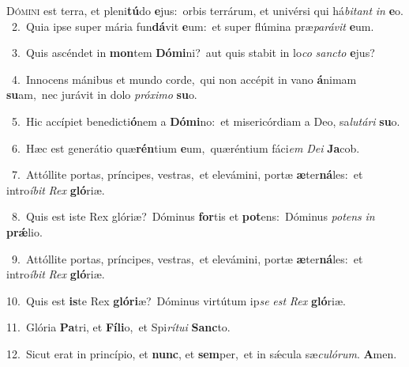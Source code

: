 \lettrine{\initial\textcolor{\initialcolor}{D}}{ómini} est terra, et pleni\-\textbf{tú}\-do \textbf{e}\-jus:~\star orbis terrárum, et univérsi qui há\-\textit{bi}\-\textit{tant} \textit{in} \textbf{e}\-o.\\
{\numbfont\textcolor{\numbcolor}{~2.}}~Quia ipse super mária fun\-\textbf{dá}\-vit \textbf{e}\-um:~\star et super flúmina præ\-\textit{pa}\-\textit{rá}\textit{vit} \textbf{e}\-um.\par
{\numbfont\textcolor{\numbcolor}{~3.}}~Quis ascéndet in \textbf{mon}\-tem \textbf{Dó}\-\textbf{mi}ni?~\star aut quis stabit in lo\textit{co} \textit{sanc}\-\textit{to} \textbf{e}\-jus?\par
{\numbfont\textcolor{\numbcolor}{~4.}}~Innocens mánibus et mundo corde,~\dagger qui non accépit in vano \textbf{á}\-nimam \textbf{su}\-am,~\star nec jurávit in dolo \textit{pró}\-\textit{xi}\textit{mo} \textbf{su}\-o.\par
{\numbfont\textcolor{\numbcolor}{~5.}}~Hic accípiet benedicti\-\textbf{ó}\-nem a \textbf{Dó}\-\textbf{mi}no:~\star et misericórdiam a Deo, sa\-\textit{lu}\-\textit{tá}\textit{ri} \textbf{su}\-o.\par
{\numbfont\textcolor{\numbcolor}{~6.}}~Hæc est generátio quæ\-\textbf{rén}\-tium \textbf{e}\-um,~\star quæréntium fáci\textit{em} \textit{De}\-\textit{i} \textbf{Ja}\-cob.\par
{\numbfont\textcolor{\numbcolor}{~7.}}~Attóllite portas, príncipes, vestras,~\dagger et elevámini, portæ \textbf{æ}\-ter\-\textbf{ná}\-les:~\star et intro\-\textit{í}\-\textit{bit} \textit{Rex} \textbf{gló}\-riæ.\par
{\numbfont\textcolor{\numbcolor}{~8.}}~Quis est iste Rex glóriæ?~\dagger Dóminus \textbf{for}\-tis et \textbf{pot}\-ens:~\star Dóminus \textit{pot}\-\textit{ens} \textit{in} \textbf{prǽ}\-lio.\par
{\numbfont\textcolor{\numbcolor}{~9.}}~Attóllite portas, príncipes, vestras,~\dagger et elevámini, portæ \textbf{æ}\-ter\-\textbf{ná}\-les:~\star et intro\-\textit{í}\-\textit{bit} \textit{Rex} \textbf{gló}\-riæ.\par
{\numbfont\textcolor{\numbcolor}{10.}}~Quis est \textbf{is}\-te Rex \textbf{gló}\-\textbf{ri}æ?~\star Dóminus virtútum ip\textit{se} \textit{est} \textit{Rex} \textbf{gló}\-riæ.\par
{\numbfont\textcolor{\numbcolor}{11.}}~Glória \textbf{Pa}\-tri, et \textbf{Fí}\-\textbf{li}o,~\star et Spi\-\textit{rí}\-\textit{tu}\textit{i} \textbf{Sanc}\-to.\par
{\numbfont\textcolor{\numbcolor}{12.}}~Sicut erat in princípio, et \textbf{nunc}\-, et \textbf{sem}\-per,~\star et in sǽcula sæ\-\textit{cu}\-\textit{ló}\textit{rum}. \textbf{A}\-men.\par
